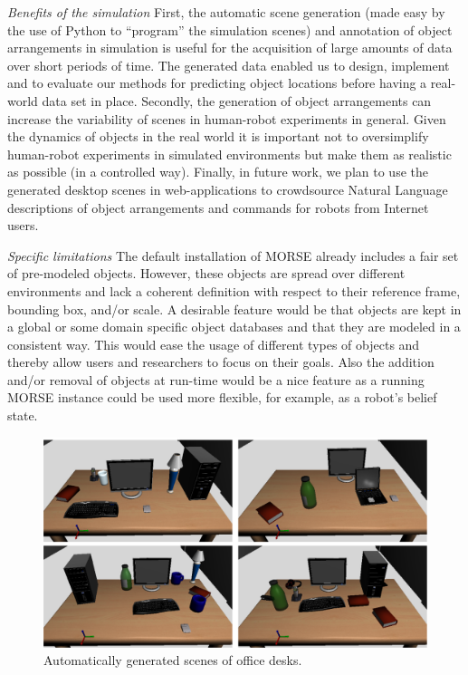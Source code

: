\documentclass[conference]{IEEEtran}
\begin{document}
\emph{Benefits of the simulation} First, the automatic scene generation (made
easy by the use of Python to ``program'' the simulation scenes) and annotation
of object arrangements in simulation is useful for the acquisition of large
amounts of data over short periods of time. The generated data enabled us to
design, implement and to evaluate our methods for predicting object locations
before having a real-world data set in place. Secondly, the generation of object
arrangements can increase the variability of scenes in human-robot experiments
in general. Given the dynamics of objects in the real world it is important not
to oversimplify human-robot experiments in simulated environments but make them
as realistic as possible (in a controlled way). Finally, in future work, we plan
to use the generated desktop scenes in web-applications to crowdsource Natural
Language descriptions of object arrangements and commands for robots from
Internet users.

\emph{Specific limitations} The default installation of MORSE already includes a
fair set of pre-modeled objects. However, these objects are spread over
different environments and lack a coherent definition with respect to their
reference frame, bounding box, and/or scale. A desirable feature would be that
objects are kept in a global or some domain specific object databases and that
they are modeled in a consistent way. This would ease the usage of different
types of objects and thereby allow users and researchers to focus on their
goals. Also the addition and/or removal of objects at run-time would be a nice
feature as a running MORSE instance could be used more flexible, for example,
as a robot's belief state.

\begin{figure}[tb]
  \centering
  \includegraphics[width=.9\columnwidth]{figs/scenes.png}
  \caption{Automatically generated scenes of office desks.}
  \label{fig:simulated-desktop-scenes}
\end{figure}
\end{document}
